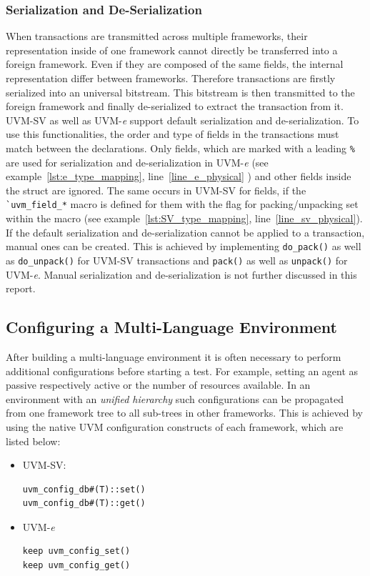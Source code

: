 \subsubsection{Serialization and De-Serialization}
When transactions are transmitted across multiple frameworks, their representation inside of one framework cannot
directly be transferred into a foreign framework. Even if they are composed of the same fields, the internal
representation differ between frameworks. Therefore transactions are firstly serialized into an universal bitstream.
This bitstream is then transmitted to the foreign framework and finally de-serialized to extract the transaction from
it.\\
UVM-SV as well as UVM-\textit{e} support default serialization and de-serialization. To use this
functionalities,  the order and type of fields in the transactions must match between the declarations. Only fields,
which are marked with a leading \lstinline$%$ are used for serialization and de-serialization in UVM-\textit{e} (see
example~\ref{lst:e_type_mapping}, line~\ref{line_e_physical} ) and other fields inside the struct are ignored. The same
occurs in UVM-SV for fields, if the \lstinline$`uvm_field_*$ macro is defined for them with the flag for
packing/unpacking set within the macro (see example~\ref{lst:SV_type_mapping}, line~\ref{line_sv_physical}).\\
If the default serialization and de-serialization cannot be applied to a transaction, manual ones can be created. This is achieved by
implementing \lstinline$do_pack()$ as well as \lstinline$do_unpack()$ for UVM-SV transactions and
\lstinline$pack()$ as well as \lstinline$unpack()$ for UVM-\textit{e}. Manual serialization and de-serialization is not further discussed in this report. 
\subsection{Configuring a Multi-Language Environment} \label{ml_config}
After building a multi-language environment it is often necessary to perform additional configurations before starting a
test. For example, setting an agent as passive respectively active or the number of resources available. In an
environment with an \emph{unified hierarchy} such configurations can be propagated from one framework tree
to all sub-trees in other frameworks. This is achieved by using the native UVM configuration constructs of each
framework, which are listed below:
\begin{itemize}
\item{UVM-SV:}
{}
\begin{lstlisting}
uvm_config_db#(T)::set()
uvm_config_db#(T)::get()
\end{lstlisting} 

\item{UVM-\textit{e}}
{}
\begin{lstlisting}
keep uvm_config_set()
keep uvm_config_get()
\end{lstlisting} 
\end{itemize}


